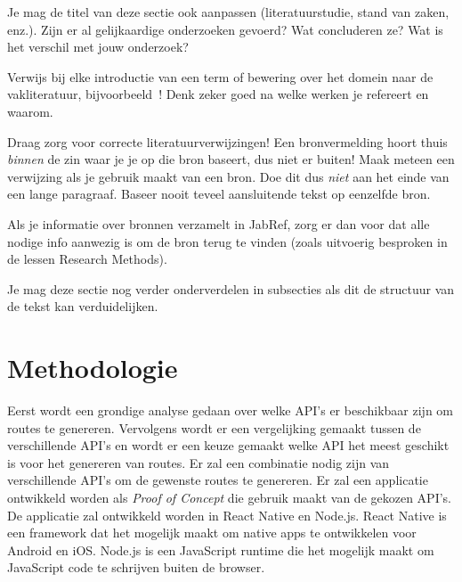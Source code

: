 Je mag de titel van deze sectie ook aanpassen (literatuurstudie, stand van zaken, enz.). Zijn er al gelijkaardige onderzoeken gevoerd? Wat concluderen ze? Wat is het verschil met jouw onderzoek?

Verwijs bij elke introductie van een term of bewering over het domein naar de vakliteratuur, bijvoorbeeld~\autocite{Hykes2013}! Denk zeker goed na welke werken je refereert en waarom.

Draag zorg voor correcte literatuurverwijzingen! Een bronvermelding hoort thuis \emph{binnen} de zin waar je je op die bron baseert, dus niet er buiten! Maak meteen een verwijzing als je gebruik maakt van een bron. Doe dit dus \emph{niet} aan het einde van een lange paragraaf. Baseer nooit teveel aansluitende tekst op eenzelfde bron.

Als je informatie over bronnen verzamelt in JabRef, zorg er dan voor dat alle nodige info aanwezig is om de bron terug te vinden (zoals uitvoerig besproken in de lessen Research Methods).


Je mag deze sectie nog verder onderverdelen in subsecties als dit de structuur van de tekst kan verduidelijken.

\section{Methodologie}%
\label{sec:methodologie}

Eerst wordt een grondige analyse gedaan over welke API's er beschikbaar zijn om routes te genereren. Vervolgens wordt er een vergelijking gemaakt tussen de verschillende API's en wordt er een keuze gemaakt welke API het meest geschikt is voor het genereren van routes. Er zal een combinatie nodig zijn van verschillende API's om de gewenste routes te genereren. 
Er zal een applicatie ontwikkeld worden als \emph{Proof of Concept} die gebruik maakt van de gekozen API's. De applicatie zal ontwikkeld worden in React Native en Node.js. React Native is een framework dat het mogelijk maakt om native apps te ontwikkelen voor Android en iOS\@. Node.js is een JavaScript runtime die het mogelijk maakt om JavaScript code te schrijven buiten de browser.

